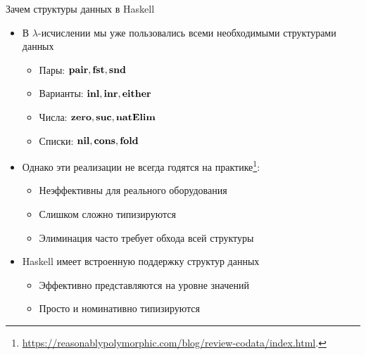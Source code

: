     \begin{frame}[fragile]{Зачем структуры данных в Haskell}
        \begin{itemize}
            \item В $\lambda$-исчислении мы уже пользовались всеми необходимыми структурами данных
            \begin{itemize}
                \item Пары: $\mathbf{pair}, \mathbf{fst}, \mathbf{snd}$
                \item Варианты: $\mathbf{inl}, \mathbf{inr}, \mathbf{either}$
                \item Числа: $\mathbf{zero}, \mathbf{suc}, \mathbf{natElim}$
                \item Списки: $\mathbf{nil}, \mathbf{cons}, \mathbf{fold}$
            \end{itemize}
            \item Однако эти реализации не всегда годятся на практике\footnote{\color{blue} \url{https://reasonablypolymorphic.com/blog/review-codata/index.html}.}:
            \begin{itemize}
                \item Неэффективны для реального оборудования
                \item Слишком сложно типизируются
                \item Элиминация часто требует обхода всей структуры
            \end{itemize}
            \item Haskell имеет встроенную поддержку структур данных
            \begin{itemize}
                \item Эффективно представляются на уровне значений
                \item Просто и номинативно типизируются
            \end{itemize}
        \end{itemize}
    \end{frame}


